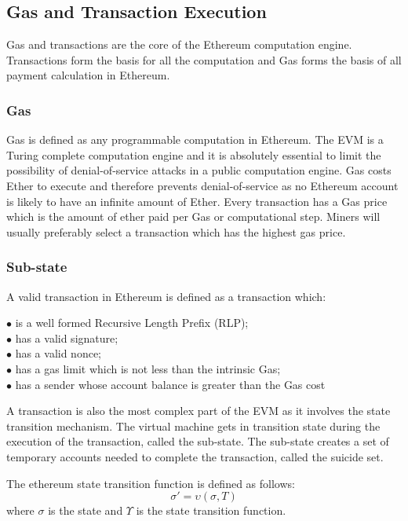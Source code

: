 \documentclass[a4paper,twoside,phd]{BYUPhys}
\begin{document}
\subsection{Gas and Transaction Execution}
Gas and transactions are the core of the Ethereum computation engine. Transactions form the basis for all the computation and Gas forms the basis of all payment calculation in Ethereum.
\subsubsection{Gas}
Gas is defined as any programmable computation in Ethereum. The EVM is a Turing complete computation engine and it is absolutely essential to limit the possibility of denial-of-service attacks in a public computation engine. Gas costs Ether to execute and therefore prevents denial-of-service as no Ethereum account is likely to have an infinite amount of Ether. Every transaction has a Gas price which is the amount of ether paid per Gas or computational step. Miners will usually preferably select a transaction which has the highest gas price.
\subsubsection{Sub-state}
A valid transaction in Ethereum is defined as a transaction which:
\begin{description}
\item [$\bullet$ is a well formed Recursive Length Prefix (RLP);]
\item [$\bullet$ has a valid signature;]
\item [$\bullet$ has a valid nonce;]
\item [$\bullet$ has a gas limit which is not less than the intrinsic Gas;]
\item [$\bullet$ has a sender whose account balance is greater than the Gas cost]
\end{description}

A transaction is also the most complex part of the EVM as it involves the state transition mechanism. The virtual machine gets in transition state during the execution of the transaction, called the sub-state. The sub-state creates a set of temporary accounts needed to complete the transaction, called the suicide set.

The ethereum state transition function is defined as follows: \[\sigma' = \upsilon(\sigma, T)\]
where $\sigma$ is the state and $\Upsilon$ is the state transition function.
\end{document}
